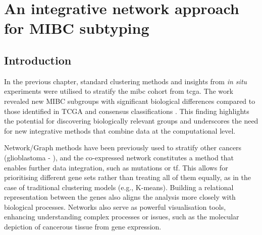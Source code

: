 \chapter{An integrative network approach for MIBC subtyping} \label{s:N_I}


\vspace{3mm}
\vspace{3mm}


\section{Introduction}

In the previous chapter, standard clustering methods and insights from \textit{in situ} experiments \citep{Baker2022-bj} were utilised to stratify the \acrfull{mibc} cohort from \acrfull{tcga}. The work revealed new MIBC subgroups with significant biological differences compared to those identified in TCGA and consensus classifications \citep{Robertson2017-mg,Kamoun2020-tj}. This finding highlights the potential for discovering biologically relevant groups and underscores the need for new integrative methods that combine data at the computational level.

Network/Graph methods have been previously used to stratify other cancers (glioblastoma - \citet{Care2019-ij}), and the co-expressed network constitutes a method that enables further data integration, such as mutations or \acrfull{tf}. This allows for prioritising different gene sets rather than treating all of them equally, as in the case of traditional clustering models (e.g., K-means). Building a relational representation between the genes also aligns the analysis more closely with biological processes. Networks also serve as powerful visualisation tools, enhancing understanding complex processes or issues, such as the molecular depiction of cancerous tissue from gene expression.

